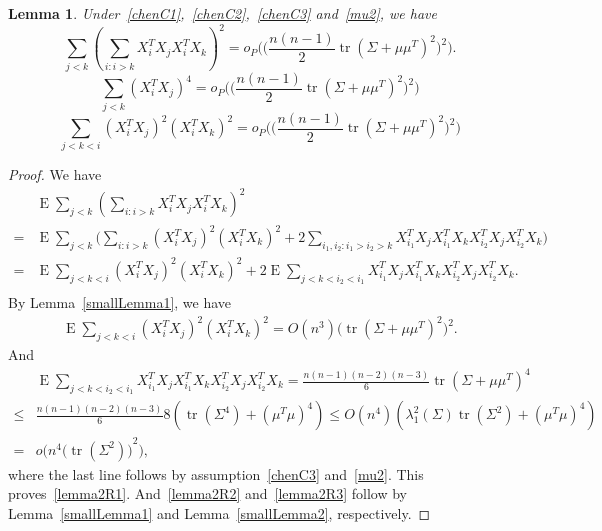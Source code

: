 \documentclass[review]{elsarticle}
\DeclareMathOperator{\mytr}{tr}
\DeclareMathOperator{\myE}{E}
\theoremstyle{plain}
\newtheorem{lemma}{Lemma}
\theoremstyle{definition}
\theoremstyle{remark}
\begin{document}
\begin{lemma}
    Under~\eqref{chenC1},~\eqref{chenC2},~\eqref{chenC3} and~\eqref{mu2},
we have
    \begin{equation}\label{lemma2R1}
        \sum_{j<k}{(\sum_{i:i>k}X_i^T X_j X_i^T X_k)}^2
        =o_P\Big(\big(\frac{n(n-1)}{2}\mytr (\Sigma+\mu\mu^T)^2\big)^2\Big).
    \end{equation}
    \begin{equation}\label{lemma2R2}
        \sum_{j<k}{(X_i^T X_j)}^4=o_P\Big(\big(\frac{n(n-1)}{2}\mytr (\Sigma+\mu\mu^T)^2\big)^2\Big)
    \end{equation}
    \begin{equation}\label{lemma2R3}
        \sum_{j<k<i}{(X_i^T X_j)}^2{(X_i^T X_k)}^2 =o_P\Big(\big(\frac{n(n-1)}{2}\mytr (\Sigma+\mu\mu^T)^2\big)^2\Big)
    \end{equation}
\end{lemma}
\begin{proof}
    We have
    \begin{equation*}
    \begin{aligned}
        &\myE\sum_{j<k}{(\sum_{i:i>k}X_i^T X_j X_i^T X_k)}^2\\
        =&
        \myE\sum_{j<k}\Big(\sum_{i:i>k}(X_i^T X_j)^2 (X_i^T X_k)^2
        +2\sum_{i_1,i_2:i_1>i_2>k}X_{i_1}^T X_j X_{i_1}^T X_k X_{i_2}^T X_j X_{i_2}^T X_k\Big)\\
        =&
        \myE\sum_{j<k<i}(X_i^T X_j)^2 (X_i^T X_k)^2
        +2\myE\sum_{j<k<i_2<i_1}X_{i_1}^T X_j X_{i_1}^T X_k X_{i_2}^T X_j X_{i_2}^T X_k.\\
    \end{aligned}
    \end{equation*}
    By Lemma~\ref{smallLemma1}, we have
    \begin{equation*}
    \begin{aligned}
        \myE\sum_{j<k<i}(X_i^T X_j)^2 (X_i^T X_k)^2    =O(n^3)\big(\mytr (\Sigma+\mu\mu^T)^2\big)^2.
    \end{aligned}
    \end{equation*}
And
    \begin{equation*}
    \begin{aligned}
        &\myE\sum_{j<k<i_2<i_1}X_{i_1}^T X_j X_{i_1}^T X_k X_{i_2}^T X_j X_{i_2}^T X_k
        =\frac{n(n-1)(n-2)(n-3)}{6}\mytr {(\Sigma+\mu\mu^T)}^4\\
        \leq& \frac{n(n-1)(n-2)(n-3)}{6}8(\mytr (\Sigma^4)+(\mu^T \mu)^4)
        \leq O(n^4)(\lambda_{1}^2(\Sigma)\mytr (\Sigma^2)+(\mu^T \mu)^4)\\
        =&
        o\Big(n^4{\big(\mytr (\Sigma^2)\big)}^2\Big),
    \end{aligned}
    \end{equation*}
    where the last line follows by assumption~\eqref{chenC3} and~\eqref{mu2}.
    This proves~\eqref{lemma2R1}. And~\eqref{lemma2R2} and~\eqref{lemma2R3} follow by Lemma~\ref{smallLemma1} and Lemma~\ref{smallLemma2}, respectively.

\end{proof}
\end{document}
